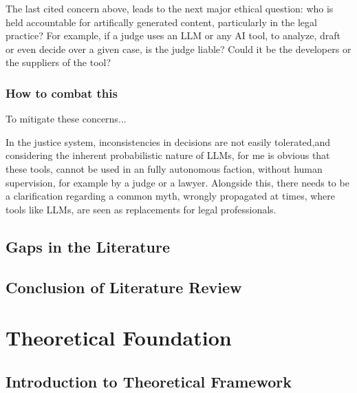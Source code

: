 \documentclass[11pt,a4paper,twoside,openright]{book}
\begin{document}
\par The last cited concern above, leads to the next major ethical question: who is held accountable for artifically generated content, particularly in the legal practice? For example, if a judge uses an LLM or any AI tool, to analyze, draft or even decide over a given case, is the judge liable? Could it be the developers or the suppliers of the tool? 

\subsection{How to combat this}


To mitigate these concerns...

In the justice system, inconsistencies in decisions are not easily tolerated,and considering the inherent probabilistic nature of LLMs, for me is obvious that these tools, cannot be used in an fully autonomous faction, without human supervision, for example by a judge or a lawyer.
Alongside this, there needs to be a clarification regarding a common myth, wrongly propagated at times, where tools like LLMs, are seen as replacements for legal professionals.





\section{Gaps in the Literature}

\section{Conclusion of Literature Review}





\chapter{Theoretical Foundation}

\section{Introduction to Theoretical Framework}
\end{document}
